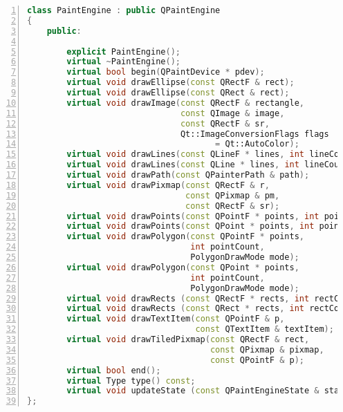 \begin{lstlisting}[language=C++,numbers=left,caption=Nagłówek klasy \emph{QPaintEngine}]
class PaintEngine : public QPaintEngine
{
    public:

        explicit PaintEngine();
        virtual ~PaintEngine();
        virtual bool begin(QPaintDevice * pdev);
        virtual void drawEllipse(const QRectF & rect);
        virtual void drawEllipse(const QRect & rect);
        virtual void drawImage(const QRectF & rectangle, 
                               const QImage & image, 
                               const QRectF & sr,
                               Qt::ImageConversionFlags flags 
                                      = Qt::AutoColor);
        virtual void drawLines(const QLineF * lines, int lineCount);
        virtual void drawLines(const QLine * lines, int lineCount);
        virtual void drawPath(const QPainterPath & path);
        virtual void drawPixmap(const QRectF & r, 
                                const QPixmap & pm, 
                                const QRectF & sr);
        virtual void drawPoints(const QPointF * points, int pointCount);
        virtual void drawPoints(const QPoint * points, int pointCount);
        virtual void drawPolygon(const QPointF * points, 
                                 int pointCount, 
                                 PolygonDrawMode mode);
        virtual void drawPolygon(const QPoint * points, 
                                 int pointCount, 
                                 PolygonDrawMode mode);
        virtual void drawRects (const QRectF * rects, int rectCount);
        virtual void drawRects (const QRect * rects, int rectCount);
        virtual void drawTextItem(const QPointF & p, 
                                  const QTextItem & textItem);
        virtual void drawTiledPixmap(const QRectF & rect, 
                                     const QPixmap & pixmap, 
                                     const QPointF & p);
        virtual bool end();
        virtual Type type() const;
        virtual void updateState (const QPaintEngineState & state);
};
\end{lstlisting}